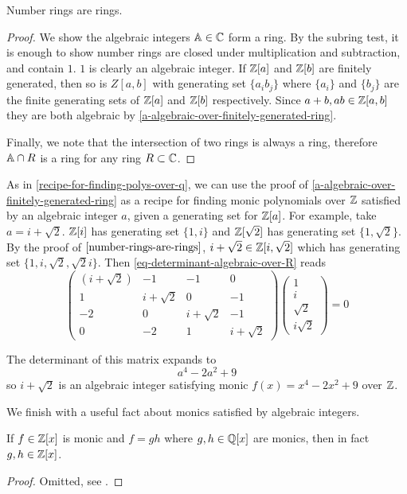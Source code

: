 \begin{corollary}\label{number-rings-are-rings}
Number rings are rings.
\end{corollary}
\begin{proof}
We show the algebraic integers $\mathbb{A}\in \mathbb{C}$ form a ring. By the subring test, it is enough to show number rings are closed under multiplication and subtraction, and contain $1$. $1$ is clearly an algebraic integer. If $\mathbb{Z}[a]$ and $\mathbb{Z}[b]$ are finitely generated, then so is $Z[a,b]$ with generating set $\{a_ib_j\}$ where $\{a_i\}$ and $\{b_j\}$ are the finite generating sets of $\mathbb{Z}[a]$ and $\mathbb{Z}[b]$ respectively. Since $a+b,ab\in \mathbb{Z}[a,b]$ they are both algebraic by \cref{a-algebraic-over-finitely-generated-ring}.

Finally, we note that the intersection of two rings is always a ring, therefore $\mathbb{A}\cap R$ is a ring for any ring $R\subset \mathbb{C}$.
\end{proof}
\begin{example}
As in \cref{recipe-for-finding-polys-over-q}, we can use the proof of  \cref{a-algebraic-over-finitely-generated-ring} as a recipe for finding monic polynomials over $\mathbb{Z}$ satisfied by an algebraic integer $a$, given a generating set for $\mathbb{Z}[a]$. For example, take $a=i+\sqrt{2}$. $\mathbb{Z}[i]$ has generating set $\{1,i\}$ and $\mathbb{Z}[\sqrt{2}]$ has generating set $\{1,\sqrt{2}\}$. By the proof of $\cref{number-rings-are-rings}$, $i+\sqrt{2}\in\mathbb{Z}[i,\sqrt{2}]$ which has generating set $\{1,i,\sqrt{2},\sqrt{2}i\}$. Then \cref{eq-determinant-algebraic-over-R} reads
$$\begin{pmatrix}
(i+\sqrt{2}) & -1 & -1 & 0\\ 
1 & i+\sqrt{2} & 0 & -1\\
-2 & 0 & i+\sqrt{2} & -1\\
0 & -2 & 1 & i+\sqrt{2}
\end{pmatrix}\begin{pmatrix}1\\i\\\sqrt{2}\\i\sqrt{2}\end{pmatrix}=0$$

The determinant of this matrix expands to
$$a^4-2a^2+9$$
so $i+\sqrt{2}$ is an algebraic integer satisfying monic $f(x)=x^4-2x^2+9$ over $\mathbb{Z}$.
\end{example}

We finish with a useful fact about monics satisfied by algebraic integers.
\begin{lemma}\label{lemma-monics-are-Z}
If $f\in \mathbb{Z}[x]$ is monic and $f=gh$ where $g,h\in \mathbb{Q}[x]$ are monics, then in fact $g,h\in \mathbb{Z}[x]$.
\end{lemma}
\begin{proof}
Omitted, see \cite{NumberFields}.
\end{proof}

